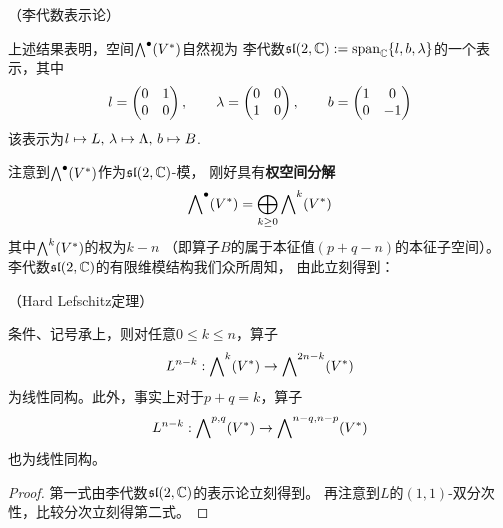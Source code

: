 \begin{rem}（李代数表示论）

上述结果表明，空间$\bigwedge\nolimits^{\bullet}(V^*)$自然视为
李代数$\mathfrak{sl}(2,\mathbb{C}):=\operatorname{span}_{\mathbb{C}}\{l,b,\lambda\}$的一个表示，其中
$$
  l=\begin{pmatrix}
      0 & 1\\
      0 & 0
    \end{pmatrix}
,\qquad
  \lambda=\begin{pmatrix}
      0 & 0\\
      1 & 0
    \end{pmatrix}
,\qquad
  b=\begin{pmatrix}
      1 & 0\\
      0 & -1
    \end{pmatrix}
$$
该表示为$l\mapsto L,\,\lambda\mapsto\Lambda,\,b\mapsto B$.
\end{rem}

注意到$\bigwedge\nolimits^{\bullet}(V^*)$作为$\mathfrak{sl}(2,\mathbb{C})$-模，
刚好具有\textbf{权空间分解}
$$
  \bigwedge\nolimits^{\bullet}(V^*)
=
  \bigoplus_{k\geq 0}
    \bigwedge\nolimits^{k}(V^*)
$$
其中$\bigwedge\nolimits^{k}(V^*)$的权为$k-n$
（即算子$B$的属于本征值$(p+q-n)$的本征子空间）。
李代数$\mathfrak{sl}(2,\mathbb{C})$的有限维模结构我们众所周知，
由此立刻得到：


\begin{thm}（Hard Lefschitz定理）
\label{HL-局部-thm}

条件、记号承上，则对任意$0\leq k\leq n$，算子
$$L^{n-k}:\bigwedge\nolimits^{k}(V^*)\to\bigwedge\nolimits^{2n-k}(V^*)$$
为线性同构。此外，事实上对于$p+q=k$，算子
$$L^{n-k}:\bigwedge\nolimits^{p,q}(V^*)\to\bigwedge\nolimits^{n-q,n-p}(V^*)$$
也为线性同构。
\end{thm}

\begin{proof}
第一式由李代数$\mathfrak{sl}(2,\mathbb{C})$的表示论立刻得到。
再注意到$L$的$(1,1)$-双分次性，比较分次立刻得第二式。
\end{proof}


